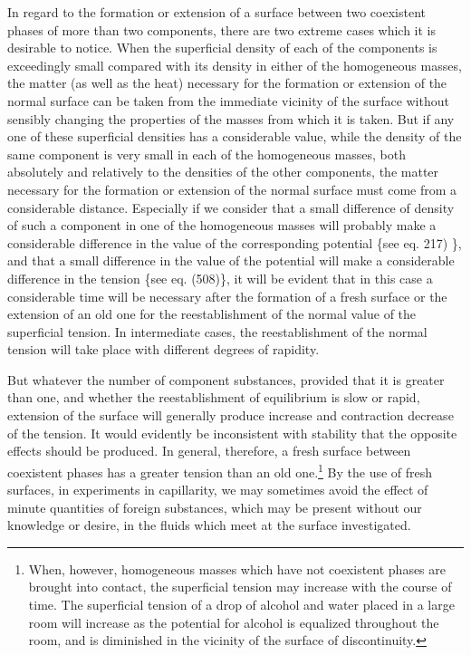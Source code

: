 \documentclass[12pt]{article}
\begin{document}
{In regard to the formation or extension of a surface between two coexistent phases of more than two components, there are two extreme cases which it is desirable to notice. When the superficial density of each of the components is exceedingly small compared with its density in either of the homogeneous masses, the matter (as well as the heat) necessary for the formation or extension of the normal surface can be taken from the immediate vicinity of the surface without sensibly changing the properties of the masses from which it is taken. But if any one of these superficial densities has a considerable value, while the density of the same component is very small in each of the homogeneous masses, both absolutely and relatively to the densities of the other components, the matter necessary for the formation or extension of the normal surface must come from a considerable distance. Especially if we consider that a small difference of density of such a component in one of the homogeneous masses will probably make a considerable difference in the value of the corresponding potential \{see eq. 217) \}, and that a small difference in the value of the potential will make a considerable difference in the tension \{see eq. (508)\}, it will be evident that in this case a considerable time will be necessary after the formation of a fresh surface or the extension of an old one for the reestablishment of the normal value of the superficial tension. In intermediate cases, the reestablishment of the normal tension will take place with different degrees of rapidity.

But whatever the number of component substances, provided that it is greater than one, and whether the reestablishment of equilibrium is slow or rapid, extension of the surface will generally produce increase and contraction decrease of the tension. It would evidently be inconsistent with stability that the opposite effects should be produced. In general, therefore, a fresh surface between coexistent phases has a greater tension than an old one.\footnote{When, however, homogeneous masses which have not coexistent phases are brought into contact, the superficial tension may increase with the course of time. The superficial tension of a drop of alcohol and water placed in a large room will increase as the potential for alcohol is equalized throughout the room, and is diminished in the vicinity of the surface of discontinuity.} 
By the use of fresh surfaces, in experiments in capillarity, we may sometimes avoid the effect of minute quantities of foreign substances, which may be present without our knowledge or desire, in the fluids which meet at the surface investigated.

}
\end{document}

